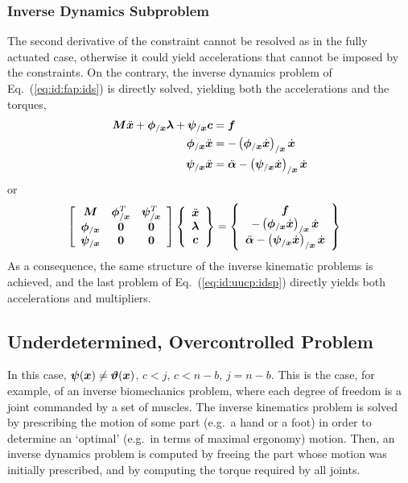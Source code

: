 \subsubsection{Inverse Dynamics Subproblem}
The second derivative of the constraint cannot be resolved
as in the fully actuated case, otherwise it could yield accelerations
that cannot be imposed by the constraints.
On the contrary, the inverse dynamics problem of Eq.~(\ref{eq:id:fap:ids})
is directly solved, yielding both the accelerations and the torques,
\begin{subequations}
\begin{align}
	\bm{M} \ddot{\bm{x}}
	+
	\bm{\phi}_{/\bm{x}} \bm{\lambda}
	+
	\bm{\psi}_{/\bm{x}} \bm{c}
	&=
	\bm{f}
	\\
	\bm{\phi}_{/\bm{x}} \ddot{\bm{x}}
	&=
	-\left( \bm{\phi}_{/\bm{x}} \dot{\bm{x}} \right)_{/\bm{x}} \dot{\bm{x}}
	\\
	\bm{\psi}_{/\bm{x}} \ddot{\bm{x}}
	&=
	\ddot{\bm{\alpha}}
	-
	\left( \bm{\psi}_{/\bm{x}} \dot{\bm{x}} \right)_{/\bm{x}} \dot{\bm{x}}
\end{align}
\end{subequations}
or
\begin{align}
	\sqbr{\matr{ccc}{
		\TT{M} & \T{\phi}_{/\T{x}}^T & \T{\psi}_{/\T{x}}^T
		\\
		\T{\phi}_{/\T{x}} & \TT{0} & \TT{0}
		\\
		\T{\psi}_{/\T{x}} & \TT{0} & \TT{0}
	}} \cubr{\cvvect{
		\ddot{\T{x}}
		\\
		\T{\lambda}
		\\
		\T{c}
	}}
	&=
	\cubr{\cvvect{
		\T{f}
		\\
		-\plbr{\T{\phi}_{/\T{x}} \dot{\T{x}}}_{/\T{x}} \dot{\T{x}}
		\\
		\ddot{\T{\alpha}}
		-
		\plbr{\T{\psi}_{/\T{x}} \dot{\T{x}}}_{/\T{x}} \dot{\T{x}}
	}}
	\label{eq:id:uucp:idsp}
\end{align}
As a consequence, the same structure of the inverse kinematic problems
is achieved, and the last problem of Eq.~(\ref{eq:id:uucp:idsp})
directly yields both accelerations and multipliers.




\subsection{Underdetermined, Overcontrolled Problem}
\label{sec:id:uop}
In this case, $\bm{\psi}(\bm{x}) \neq \bm{\vartheta}(\bm{x})$,
$c < j$, $c < n - b$, $j = n - b$.
This is the case, for example, of an inverse biomechanics problem,
where each degree of freedom is a joint commanded by a set of muscles.
The inverse kinematics problem is solved by prescribing the motion
of some part (e.g.\ a hand or a foot) in order to determine an `optimal'
(e.g.\ in terms of maximal ergonomy) motion.
Then, an inverse dynamics problem is computed by freeing the part
whose motion was initially prescribed, and by computing the torque
required by all joints.

